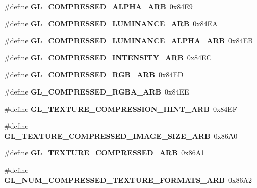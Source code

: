 \begin{DoxyCompactItemize}
\item 
\#define {\bfseries G\+L\+\_\+\+C\+O\+M\+P\+R\+E\+S\+S\+E\+D\+\_\+\+A\+L\+P\+H\+A\+\_\+\+A\+R\+B}~0x84\+E9\label{_s_d_l__opengl_8h_a5aa819cf8c5d8f10d395fbf20b9ad6ff}

\item 
\#define {\bfseries G\+L\+\_\+\+C\+O\+M\+P\+R\+E\+S\+S\+E\+D\+\_\+\+L\+U\+M\+I\+N\+A\+N\+C\+E\+\_\+\+A\+R\+B}~0x84\+E\+A\label{_s_d_l__opengl_8h_a70ee883c02540c3f82e6c2c0f88a6e98}

\item 
\#define {\bfseries G\+L\+\_\+\+C\+O\+M\+P\+R\+E\+S\+S\+E\+D\+\_\+\+L\+U\+M\+I\+N\+A\+N\+C\+E\+\_\+\+A\+L\+P\+H\+A\+\_\+\+A\+R\+B}~0x84\+E\+B\label{_s_d_l__opengl_8h_a64aae08d8243ef671bf2a19afc9cc5a4}

\item 
\#define {\bfseries G\+L\+\_\+\+C\+O\+M\+P\+R\+E\+S\+S\+E\+D\+\_\+\+I\+N\+T\+E\+N\+S\+I\+T\+Y\+\_\+\+A\+R\+B}~0x84\+E\+C\label{_s_d_l__opengl_8h_a2e0d1a6db7da0abc561463f125e397bb}

\item 
\#define {\bfseries G\+L\+\_\+\+C\+O\+M\+P\+R\+E\+S\+S\+E\+D\+\_\+\+R\+G\+B\+\_\+\+A\+R\+B}~0x84\+E\+D\label{_s_d_l__opengl_8h_a94ca346f3a187ec925bea865cd9ca78b}

\item 
\#define {\bfseries G\+L\+\_\+\+C\+O\+M\+P\+R\+E\+S\+S\+E\+D\+\_\+\+R\+G\+B\+A\+\_\+\+A\+R\+B}~0x84\+E\+E\label{_s_d_l__opengl_8h_aae4672d854ed9febf82945f9fea7f393}

\item 
\#define {\bfseries G\+L\+\_\+\+T\+E\+X\+T\+U\+R\+E\+\_\+\+C\+O\+M\+P\+R\+E\+S\+S\+I\+O\+N\+\_\+\+H\+I\+N\+T\+\_\+\+A\+R\+B}~0x84\+E\+F\label{_s_d_l__opengl_8h_ae2e92ecb1bf69bad3e1f9791ebc10071}

\item 
\#define {\bfseries G\+L\+\_\+\+T\+E\+X\+T\+U\+R\+E\+\_\+\+C\+O\+M\+P\+R\+E\+S\+S\+E\+D\+\_\+\+I\+M\+A\+G\+E\+\_\+\+S\+I\+Z\+E\+\_\+\+A\+R\+B}~0x86\+A0\label{_s_d_l__opengl_8h_a4d3adca17ec71753a1f47338258a6442}

\item 
\#define {\bfseries G\+L\+\_\+\+T\+E\+X\+T\+U\+R\+E\+\_\+\+C\+O\+M\+P\+R\+E\+S\+S\+E\+D\+\_\+\+A\+R\+B}~0x86\+A1\label{_s_d_l__opengl_8h_a016a33500d8145b8b325cc28a4cd98df}

\item 
\#define {\bfseries G\+L\+\_\+\+N\+U\+M\+\_\+\+C\+O\+M\+P\+R\+E\+S\+S\+E\+D\+\_\+\+T\+E\+X\+T\+U\+R\+E\+\_\+\+F\+O\+R\+M\+A\+T\+S\+\_\+\+A\+R\+B}~0x86\+A2\label{_s_d_l__opengl_8h_afea861fd6a3db5b4956cd15bc86c832d}


\end{DoxyCompactItemize}
